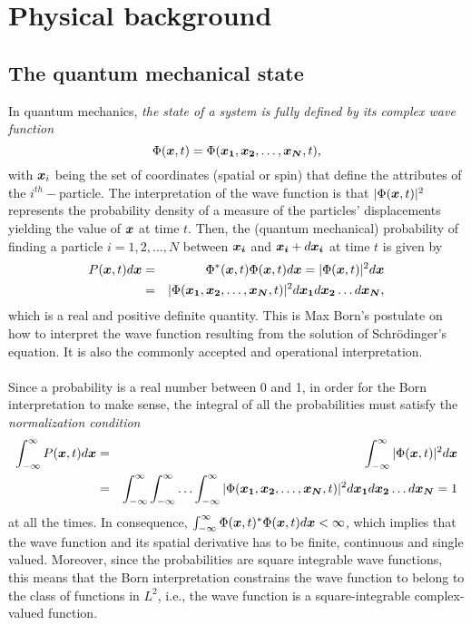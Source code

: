 

\chapter{Physical background}\label{QM}
\section{The quantum mechanical state}\label{quantumState}
In quantum mechanics, \emph{the state of a system is fully defined by its complex wave function}
$$
\Phi(\boldsymbol{x}, t) = \Phi(\boldsymbol{x_1}, \boldsymbol{x_2}, \ldots,\boldsymbol{x_N}, t),
$$
with $\boldsymbol{x}_i$ being the set of coordinates (spatial or spin) that define the attributes of the $i^{th}-$particle.  The interpretation of the wave function is that $|\Phi(\boldsymbol{x},t)|^2$ represents the probability density of a measure of the particles' displacements yielding the value of $\boldsymbol{x}$ at time $t$. Then, the (quantum mechanical) probability of finding a particle $i=1,2,\ldots,N$ between $\boldsymbol{x_i}$ and $\boldsymbol{x_i} + d\boldsymbol{x_i}$ at time $t$ is given by\cite{Fitzpatrick} 
\begin{eqnarray}\label{Max_Born}
P(\boldsymbol{x}, t) d\boldsymbol{x} & = & \Phi^*(\boldsymbol{x},t) \Phi(\boldsymbol{x},t) d\boldsymbol{x} = |\Phi(\boldsymbol{x}, t)|^2 d\boldsymbol{x}\nonumber\\ 
& = & |\Phi(\boldsymbol{x_1}, \boldsymbol{x_2}, \ldots,\boldsymbol{x_N}, t)|^2 d\boldsymbol{x_1} d\boldsymbol{x_2} \ldots d\boldsymbol{x_N},
\end{eqnarray}
which is a real and positive definite quantity. This is Max Born's postulate on how to interpret the wave function resulting from the solution of Schr\"odinger's equation. It is also the commonly accepted and operational interpretation.\\
\\
Since a probability is a real number between 0 and 1, in order for the Born interpretation to make sense, the integral of all the probabilities must satisfy the \emph{normalization condition}
\begin{eqnarray}
\int_{-\infty}^{\infty} P(\boldsymbol{x},t) d\boldsymbol{x} & = & \int_{-\infty}^{\infty} |\Phi(\boldsymbol{x}, t)|^2 d\boldsymbol{x}\nonumber\\
& = &\int_{-\infty}^{\infty} \int_{-\infty}^{\infty} \ldots \int_{-\infty}^{\infty} |\Phi(\boldsymbol{x_1}, \boldsymbol{x_2}, \ldots,\boldsymbol{x_N}, t)|^2 d\boldsymbol{x_1} d\boldsymbol{x_2} \ldots d\boldsymbol{x_N} = 1\nonumber\\
\end{eqnarray}
at all the times. In consequence, $ \int_{-\infty}^{\infty}\Phi(\boldsymbol{x},t)^*\Phi(\boldsymbol{x},t)d\boldsymbol{x} < \infty$, which implies that the wave function and its spatial derivative has to be finite, continuous and single valued. Moreover, since the probabilities are square integrable wave functions, this means that the Born interpretation constrains the wave function to belong to the class of functions in $L^2$, i.e., the wave function is a square-integrable complex-valued function.

